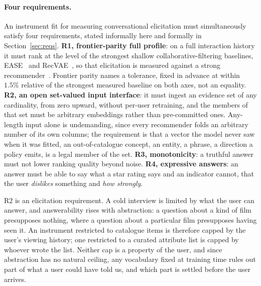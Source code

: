 \documentclass[manuscript,screen,review]{acmart}
\begin{document}
\paragraph{Four requirements.} An instrument fit for measuring conversational elicitation must simultaneously satisfy four requirements, stated informally here and formally in Section~\ref{sec:reqs}. \textbf{R1, frontier-parity full profile}: on a full interaction history it must rank at the level of the strongest shallow collaborative-filtering baselines, EASE~\citep{steck2019ease} and RecVAE~\citep{ren2020recvae}, so that elicitation is measured against a strong recommender~\citep{dacrema2019progress}. Frontier parity names a tolerance, fixed in advance at within $1.5\%$ relative of the strongest measured baseline on both axes, not an equality. \textbf{R2, an open set-valued input interface}: it must ingest an evidence set of any cardinality, from zero upward, without per-user retraining, and the members of that set must be arbitrary embeddings rather than pre-committed ones. Any-length input alone is undemanding, since every recommender folds an arbitrary number of its own columns; the requirement is that a vector the model never saw when it was fitted, an out-of-catalogue concept, an entity, a phrase, a direction a policy emits, is a legal member of the set. \textbf{R3, monotonicity}: a truthful answer must not lower ranking quality beyond noise. \textbf{R4, expressive answers}: an answer must be able to say what a star rating says and an indicator cannot, that the user \emph{dislikes} something and \emph{how strongly}.

R2 is an elicitation requirement. A cold interview is limited by what the user can answer, and answerability rises with abstraction: a question about a kind of film presupposes nothing, where a question about a particular film presupposes having seen it. An instrument restricted to catalogue items is therefore capped by the user's viewing history; one restricted to a curated attribute list is capped by whoever wrote the list. Neither cap is a property of the user, and since abstraction has no natural ceiling, any vocabulary fixed at training time rules out part of what a user could have told us, and which part is settled before the user arrives.
\end{document}
